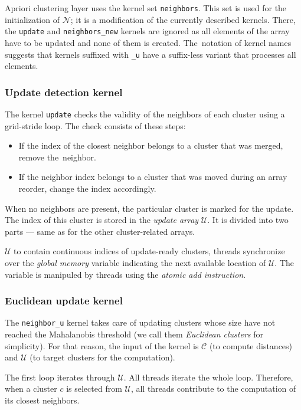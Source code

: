 Apriori clustering layer uses the kernel set \texttt{neighbors}. This set is used for the initialization of $\mathcal{N}$; it is a modification of the currently described kernels. There, the \texttt{update} and \texttt{neighbors\_new} kernels are ignored as all elements of the array have to be updated and none of them is created. The~notation of kernel names suggests that kernels suffixed with \texttt{\_u} have a suffix-less variant that processes all elements.

\subsubsection{Update detection kernel}
The kernel \texttt{update} checks the validity of the neighbors of each cluster using a grid-stride loop. The check consists of these steps:
\begin{itemize}
	\item If the index of the closest neighbor belongs to a cluster that was merged, remove the~neighbor.
	\item If the neighbor index belongs to a cluster that was moved during an array reorder, change the index accordingly.
\end{itemize} 
When no neighbors are present, the particular cluster is marked for the update. The index of this cluster is stored in the \emph{update array} $\mathcal{U}$. It is divided into two parts --- same as for the other cluster-related arrays. 

$\mathcal{U}$ to contain continuous indices of update-ready clusters, threads synchronize over the \emph{global memory} variable indicating the next available location of $\mathcal{U}$. The variable is manipuled by threads using the \emph{atomic add instruction}.

\subsubsection{Euclidean update kernel}

The \texttt{neighbor\_u} kernel takes care of updating clusters whose size have not reached the Mahalanobis threshold (we call them \emph{Euclidean clusters} for simplicity). For that reason, the input of the kernel is $\mathcal{C}$ (to compute distances) and $\mathcal{U}$ (to target clusters for the computation).

The first loop iterates through $\mathcal{U}$. All threads iterate the whole loop. Therefore, when a cluster $c$ is selected  from $\mathcal{U}$, all threads contribute to the computation of its closest neighbors.

